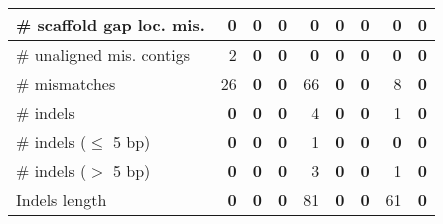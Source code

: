 \documentclass[12pt,a4paper]{article}
\begin{document}
\begin{table}[ht]
\begin{center}
\begin{tabular}{|l*{8}{|r}|}
\# scaffold gap loc. mis. & 0 & 0 & 0 & 0 & 0 & 0 & 0 & 0 \\ \hline
\# unaligned mis. contigs & 2 & {\bf 0} & {\bf 0} & {\bf 0} & {\bf 0} & {\bf 0} & {\bf 0} & {\bf 0} \\ \hline
\# mismatches & 26 & {\bf 0} & {\bf 0} & 66 & {\bf 0} & {\bf 0} & 8 & {\bf 0} \\ \hline
\# indels & {\bf 0} & {\bf 0} & {\bf 0} & 4 & {\bf 0} & {\bf 0} & 1 & {\bf 0} \\ \hline
\hspace{5mm}\# indels ($\leq$ 5 bp) & {\bf 0} & {\bf 0} & {\bf 0} & 1 & {\bf 0} & {\bf 0} & {\bf 0} & {\bf 0} \\ \hline
\hspace{5mm}\# indels ($>$ 5 bp) & {\bf 0} & {\bf 0} & {\bf 0} & 3 & {\bf 0} & {\bf 0} & 1 & {\bf 0} \\ \hline
Indels length & {\bf 0} & {\bf 0} & {\bf 0} & 81 & {\bf 0} & {\bf 0} & 61 & {\bf 0} \\ \hline
\end{tabular}
\end{center}
\end{table}
\end{document}
